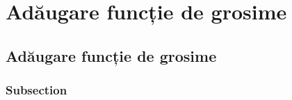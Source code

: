 \chapter{Adăugare funcție de grosime}\label{chapter:grosime}

\section{Adăugare funcție de grosime}

\subsection{Subsection}